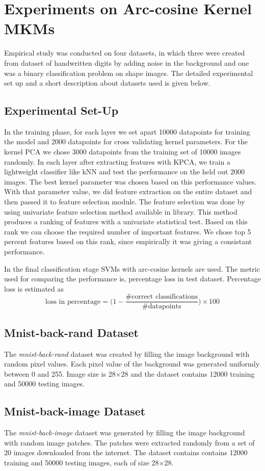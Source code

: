 \section{Experiments on Arc-cosine Kernel MKMs}
\label{chap2_exp}
Empirical study was conducted on four datasets, in which three were created from \cite{mnist} dataset of handwritten digits by adding noise in the background and one was a binary classification problem on shape images. The detailed experimental set up and a short description about datasets used is given below. 
\subsection{Experimental Set-Up}
In the training phase, for each layer we set apart 10000 datapoints for training the model and 2000 datapoints for cross validating kernel parameters. For the kernel PCA we chose 3000 datapoints  from the training set of 10000 images randomly. In each layer after extracting features with KPCA, we train a lightweight classifier like kNN and test the performance on the held out 2000 images. The best kernel parameter was chosen based on this performance values. With that parameter value, we did feature extraction on the entire dataset and then passed it to feature selection module. The feature selection was done by using univariate feature selection method available in \cite{scikit} library. This method produces a ranking of features with a univariate statistical test. Based on this rank we can choose the required number of important features. We chose top 5 percent features based on this rank, since empirically it was giving a consistant performance.

In the final classification stage SVMs with arc-cosine kernels are used. The metric used for comparing the performance is, percentage loss in test dataset. Percentage loss is estimated as
\[ \textrm{loss in percentage} = \Bigg(1 - \frac{\# \textrm{correct classifications}}{\# \textrm{datapoints}} \Bigg) \times 100 \]

\subsection{Mnist-back-rand Dataset}
The \textit{mnist-back-rand} dataset was created by filling the image background with random pixel values. Each pixel value of the background was generated uniformly between 0 and 255. Image size is 28$\times$28 and the dataset contains 12000 training and 50000 testing images.
\subsection{Mnist-back-image Dataset}
The \textit{mnist-back-image} dataset was generated by filling the image background with random image patches. The patches were extracted randomly from a set of 20 images downloaded from the internet. The dataset contains contains 12000 training and 50000 testing images, each of size 28$\times$28.
